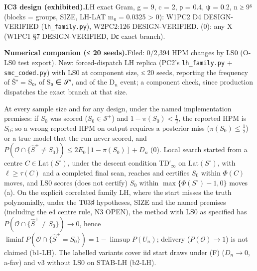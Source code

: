 {\par\smallskip\noindent\textbf{IC3 design (exhibited).}\enspace LH exact Gram, g = 9, c = 2, ρ = 0.4, ψ = 0.2, n ≥ 9⁶ (blocks = groups, SIZE, LH-LAT m₀ = 0.0325 \textgreater{} 0): W1PC2 D4 DESIGN-VERIFIED (\texttt{lh\_family.py}), W2PC2:126 DESIGN-VERIFIED. (0): any X (W1PC1 §7 DESIGN-VERIFIED, Dε exact branch).
\par\smallskip\noindent\textbf{Numerical companion (≤ 20 seeds).}\enspace Filed: 0/2,394 HPM changes by LS0 (O-LS0 test export). New: forced-dispatch LH replica (PC2's \texttt{lh\_family.py} + \texttt{smc\_coded.py}) with LS0 at component size, ≤ 20 seeds, reporting the frequency of Ŝ⁺ = S₀, of S₀ ∈ 𝒮⁺, and of the D$_{n}$ event; a component check, since production dispatches the exact branch at that size.
}

\begin{plain}
At every sample size and for any design, under the named implementation premises: if $S_0$ was scored ($S_0\in\mathcal{S}^{+}$) and $1-\pi(S_0)<\tfrac12$, the reported HPM is $S_0$; so a wrong reported HPM on output requires a posterior miss ($\pi(S_0)\le\tfrac12$) or a true model that the run never scored, and $P(\mathcal{O}\cap\{\hat{S}^{+}\ne S_0\})\le2E_0[1-\pi(S_0)]+D_n$ (0). Local search started from a centre $C\in\mathrm{Lat}(S^\circ)$, under the descent condition TD′$_{\infty}$ on $\mathrm{Lat}(S^\circ)$, with $\ell\ge\tau(C)$ and a completed final scan, reaches and certifies $S_0$ within $\Phi(C)$ moves, and LS0 scores (does not certify) $S_0$ within $\max\{\Phi(S^\circ)-1,0\}$ moves (a). On the explicit correlated family LH, where the start misses the truth polynomially, under the T03♯ hypotheses, SIZE and the named premises (including the e4 centre rule, N3 OPEN), the method with LS0 as specified has $P(\mathcal{O}\cap\{\hat{S}^{+}\ne S_0\})\to0$, hence $\liminf P(\mathcal{O}\cap\{\hat{S}^{+}=S_0\})=1-\limsup P(U_n)$; delivery ($P(\mathcal{O})\to1$) is not claimed (b1-LH). The labelled variants cover iid start draws under (F) ($D_n\to0$, a-fav) and v3 without LS0 on STAB-LH (b2-LH).
\end{plain}

